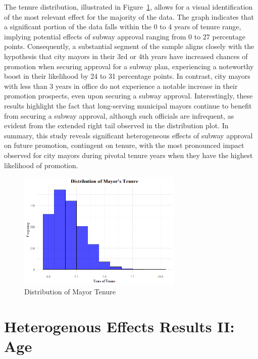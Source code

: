 \documentclass[12pt, ]{article}
\begin{document}
The tenure distribution, illustrated in Figure~\ref{fig-tendist}, allows
for a visual identification of the most relevant effect for the majority
of the data. The graph indicates that a significant portion of the data
falls within the 0 to 4 years of tenure range, implying potential
effects of subway approval ranging from 0 to 27 percentage points.
Consequently, a substantial segment of the sample aligns closely with
the hypothesis that city mayors in their 3rd or 4th years have increased
chances of promotion when securing approval for a subway plan,
experiencing a noteworthy boost in their likelihood by 24 to 31
percentage points. In contrast, city mayors with less than 3 years in
office do not experience a notable increase in their promotion
prospects, even upon securing a subway approval. Interestingly, these
results highlight the fact that long-serving municipal mayors continue
to benefit from securing a subway approval, although such officials are
infrequent, as evident from the extended right tail observed in the
distribution plot. In summary, this study reveals significant
heterogeneous effects of subway approval on future promotion, contingent
on tenure, with the most pronounced impact observed for city mayors
during pivotal tenure years when they have the highest likelihood of
promotion.

\begin{figure}[tbp]

{\centering \includegraphics[width=0.7\textwidth,height=\textheight]{figures/tenure_dist.png}

}

\caption{\label{fig-tendist}Distribution of Mayor Tenure}

\end{figure}

\hypertarget{heterogenous-effects-results-ii-age}{%
\section{Heterogenous Effects Results II:
Age}\label{heterogenous-effects-results-ii-age}}
\end{document}
